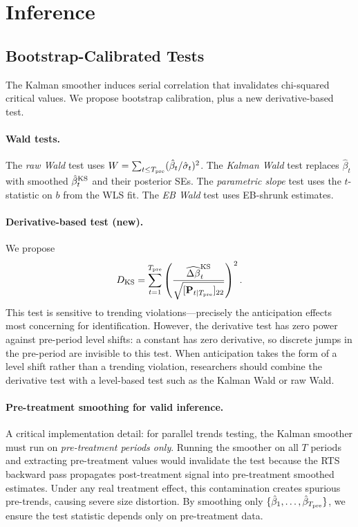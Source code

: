\documentclass[12pt]{article}
\begin{document}
\section{Inference}\label{sec:inference}

\subsection{Bootstrap-Calibrated Tests}

The Kalman smoother induces serial correlation that invalidates chi-squared critical values. We propose bootstrap calibration, plus a new derivative-based test.

\paragraph{Wald tests.} The \emph{raw Wald} test uses $W = \sum_{t \le T_{\rm pre}} (\hat{\beta}_t / \hat{\sigma}_t)^2$. The \emph{Kalman Wald} test replaces $\hat{\beta}_t$ with smoothed $\hat{\beta}^{\rm KS}_t$ and their posterior SEs. The \emph{parametric slope} test uses the $t$-statistic on $b$ from the WLS fit. The \emph{EB Wald} test uses EB-shrunk estimates.

\paragraph{Derivative-based test (new).} We propose
\begin{equation}\label{eq:deriv_test}
D_{\rm KS} = \sum_{t=1}^{T_{\rm pre}} \left(\frac{\widehat{\Delta\beta}^{\rm KS}_t}{\sqrt{[\mathbf{P}_{t|T_{\rm pre}}]_{22}}}\right)^2.
\end{equation}
This test is sensitive to trending violations---precisely the anticipation effects most concerning for identification. However, the derivative test has zero power against pre-period level shifts: a constant has zero derivative, so discrete jumps in the pre-period are invisible to this test. When anticipation takes the form of a level shift rather than a trending violation, researchers should combine the derivative test with a level-based test such as the Kalman Wald or raw Wald.

\paragraph{Pre-treatment smoothing for valid inference.} A critical implementation detail: for parallel trends testing, the Kalman smoother must run on \emph{pre-treatment periods only}. Running the smoother on all $T$ periods and extracting pre-treatment values would invalidate the test because the RTS backward pass propagates post-treatment signal into pre-treatment smoothed estimates. Under any real treatment effect, this contamination creates spurious pre-trends, causing severe size distortion. By smoothing only $\{\hat{\beta}_1, \ldots, \hat{\beta}_{T_{\rm pre}}\}$, we ensure the test statistic depends only on pre-treatment data.
\end{document}
